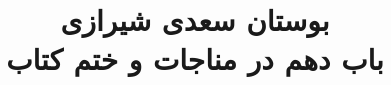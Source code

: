 \documentclass[14pt,b5paper]{article}
\begin{document}
\title{\Huge بوستان سعدی شیرازی \\
باب دهم در مناجات و ختم کتاب}
\author{ }
\date{ }
\maketitle
\newpage
\tableofcontents
\newpage

\newpage

\newpage

\newpage

\newpage
\end{document}
